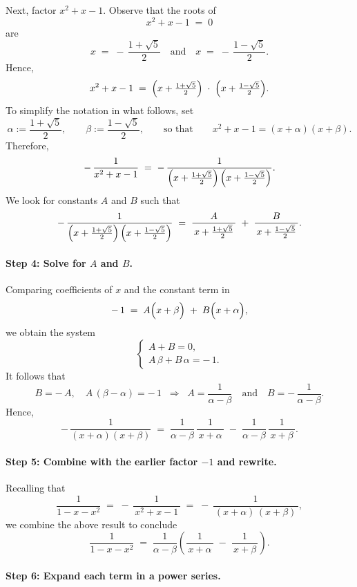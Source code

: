 \documentclass[docmute]{article}
\begin{document}
\noindent
Next, factor \(x^2 + x - 1\). Observe that the roots of
\[
x^2 + x - 1 \;=\; 0
\]
are
\[
x \;=\; -\,\frac{1 + \sqrt{5}}{2}
\quad\text{and}\quad
x \;=\; -\,\frac{1 - \sqrt{5}}{2}.
\]
Hence,
\[
x^2 + x - 1
\;=\;
\Bigl(x + \tfrac{1 + \sqrt{5}}{2}\Bigr)
\;\cdot\;
\Bigl(x + \tfrac{1 - \sqrt{5}}{2}\Bigr).
\]
To simplify the notation in what follows, set
\[
\alpha := \frac{1+\sqrt{5}}{2},
\qquad
\beta := \frac{1-\sqrt{5}}{2},
\qquad\text{so that}\qquad
x^2 + x - 1 = (x+\alpha)(x+\beta).
\]
Therefore,
\[
-\,\frac{1}{x^2 + x - 1}
\;=\;
-\,\frac{1}{\Bigl(x + \tfrac{1 + \sqrt{5}}{2}\Bigr)\,\Bigl(x + \tfrac{1 - \sqrt{5}}{2}\Bigr)}.
\]
We look for constants \(A\) and \(B\) such that
\[
-\,\frac{1}{\Bigl(x + \tfrac{1 + \sqrt{5}}{2}\Bigr)\,\Bigl(x + \tfrac{1 - \sqrt{5}}{2}\Bigr)}
\;=\;
\frac{A}{\,x + \tfrac{1 + \sqrt{5}}{2}\,}
\;+\;
\frac{B}{\,x + \tfrac{1 - \sqrt{5}}{2}\,}.
\]


\paragraph{Step 4: Solve for \(A\) and \(B\).}

Comparing coefficients of \(x\) and the constant term in
\[
-\,1
\;=\;
A\Bigl(x + \beta\Bigr)
\;+\;
B\Bigl(x + \alpha\Bigr),
\]
we obtain the system
\[
\begin{cases}
A + B = 0, \\[4pt]
A\,\beta + B\,\alpha = -\,1.
\end{cases}
\]
It follows that
\[
B = -\,A,
\quad
A\,(\beta - \alpha) = -\,1
\;\;\Longrightarrow\;\;
A = \frac{1}{\alpha - \beta}
\quad\text{and}\quad
B = -\,\frac{1}{\alpha - \beta}.
\]
Hence,
\[
-\,\frac{1}{(x+\alpha)(x+\beta)}
\;=\;
\frac{1}{\alpha - \beta}\,\frac{1}{\,x+\alpha\,}
\;-\;
\frac{1}{\alpha - \beta}\,\frac{1}{\,x+\beta\,}.
\]

\paragraph{Step 5: Combine with the earlier factor \(-1\) and rewrite.}

Recalling that
\[
\frac{1}{1 - x - x^2}
\;=\;
-\,\frac{1}{\,x^2 + x - 1\,}
\;=\;
-\,\frac{1}{\,(x+\alpha)\,(x+\beta)\,},
\]
we combine the above result to conclude
\[
\frac{1}{1 - x - x^2}
\;=\;
\frac{1}{\alpha - \beta}
\left(
\frac{1}{\,x+\alpha\,}
\;-\;
\frac{1}{\,x+\beta\,}
\right).
\]

\paragraph{Step 6: Expand each term in a power series.}
\end{document}
